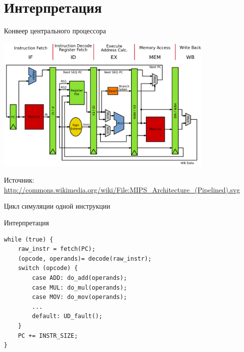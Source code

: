 \documentclass{beamer}
\begin{document}
\section{Интерпретация}

\begin{frame}{Конвеер центрального процессора}

\includegraphics[width=0.8\textwidth]{mips-pipeline}

\tiny{Источник: \url{http://commons.wikimedia.org/wiki/File:MIPS_Architecture_(Pipelined).svg}}

\end{frame} 


\begin{frame}{Цикл симуляции одной инструкции}

\centering


\end{frame} 


\begin{frame}[fragile]{Интерпретация}

\begin{verbatim}
while (true) {
	raw_instr = fetch(PC);
	(opcode, operands)= decode(raw_instr);
	switch (opcode) {
		case ADD: do_add(operands);
		case MUL: do_mul(operands);
		case MOV: do_mov(operands);
		...
		default: UD_fault();
	}
	PC += INSTR_SIZE;
}
\end{verbatim}

\end{frame} 
\end{document}
